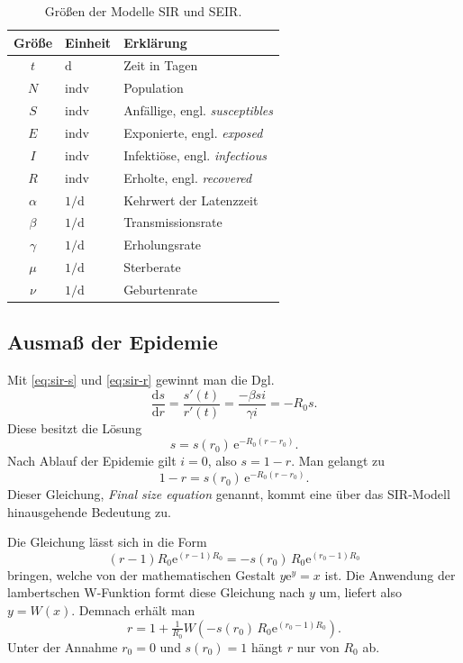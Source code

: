 \documentclass[a4paper,10pt,fleqn,twocolumn,twoside,dvipdfmx]{scrartcl}
\numberwithin{equation}{section}
\newcommand{\ee}{\mathrm e}
\newcommand{\unit}[1]{\mathrm{#1}}
\newcommand{\strong}[1]{{\sffamily\bfseries #1}}
\begin{document}
\begin{table}
\begin{tabular}{cll}
\toprule
\strong{Größe} & \strong{Einheit} & \strong{Erklärung}\\
\midrule
$t$ & $\unit{d}$ & Zeit in Tagen\\
$N$ & $\unit{indv}$ & Population\\
$S$ & $\unit{indv}$ & Anfällige, engl. \emph{susceptibles}\\
$E$ & $\unit{indv}$ & Exponierte, engl. \emph{exposed}\\
$I$ & $\unit{indv}$ & Infektiöse, engl. \emph{infectious}\\
$R$ & $\unit{indv}$ & Erholte, engl. \emph{recovered}\\
$\alpha$ & $1/\unit d$ & Kehrwert der Latenzzeit\\
$\beta$ & $1/\unit d$ & Transmissionsrate\\
$\gamma$ & $1/\unit d$ & Erholungsrate\\
$\mu$ & $1/\unit d$ & Sterberate\\
$\nu$ & $1/\unit d$ & Geburtenrate\\
\bottomrule
\end{tabular}
\caption{Größen der Modelle SIR und SEIR.}
\end{table}

\subsection{Ausmaß der Epidemie}

Mit \eqref{eq:sir-s} und \eqref{eq:sir-r} gewinnt man die Dgl.
\begin{equation}\label{eq:ODE-s-r}
\frac{\mathrm ds}{\mathrm dr} = \frac{s'(t)}{r'(t)}
= \frac{-\beta si}{\gamma i} = -R_0 s.
\end{equation}
Diese besitzt die Lösung
\begin{equation}
s = s(r_0)\,\ee^{-R_0 (r-r_0)}.
\end{equation}
Nach Ablauf der Epidemie gilt $i=0$, also $s=1-r$. Man gelangt zu%
\begin{equation}
1-r = s(r_0)\,\ee^{-R_0 (r-r_0)}.
\end{equation}
Dieser Gleichung, \emph{Final size equation} genannt,
kommt eine über das SIR-Modell hinausgehende Bedeutung zu.

Die Gleichung lässt sich in die Form
\begin{equation}
(r-1)R_0\ee^{(r-1)R_0} = -s(r_0)\,R_0\ee^{(r_0-1)R_0}
\end{equation}
bringen, welche von der mathematischen Gestalt $y\ee^y = x$ ist.
Die Anwendung der lambertschen W-Funktion formt diese Gleichung
nach $y$ um, liefert also $y=W(x)$. Demnach erhält man%
\begin{equation}
r = 1+\tfrac{1}{R_0}W(-s(r_0)\,R_0\ee^{(r_0-1)R_0}).
\end{equation}
Unter der Annahme $r_0=0$ und $s(r_0)=1$ hängt $r$ nur von
$R_0$ ab.
\end{document}

